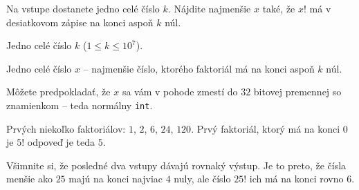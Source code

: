 





Na vstupe dostanete jedno celé číslo $k$. Nájdite najmenšie $x$ také, že $x!$ má v desiatkovom
zápise na konci aspoň $k$ núl.


Jedno celé číslo $k$ ($1 \leq k \leq 10^7$).


Jedno celé číslo $x$ -- najmenšie číslo, ktorého faktoriál má na konci aspoň $k$ núl.

Môžete predpokladať, že $x$ sa vám v pohode zmestí do $32$ bitovej premennej so znamienkom -- teda
normálny \texttt{int}.


\komentar
Prvých niekoľko faktoriálov: $1$, $2$, $6$, $24$, $120$. Prvý faktoriál, ktorý má na konci $0$ je
$5!$ odpoveď je teda $5$.
\koniec

\koniec

\komentar
Všimnite si, že posledné dva vstupy dávajú rovnaký výstup. Je to preto, že čísla menšie ako $25$
majú na konci najviac $4$ nuly, ale číslo $25!$ ich má na konci rovno $6$.
\koniec


